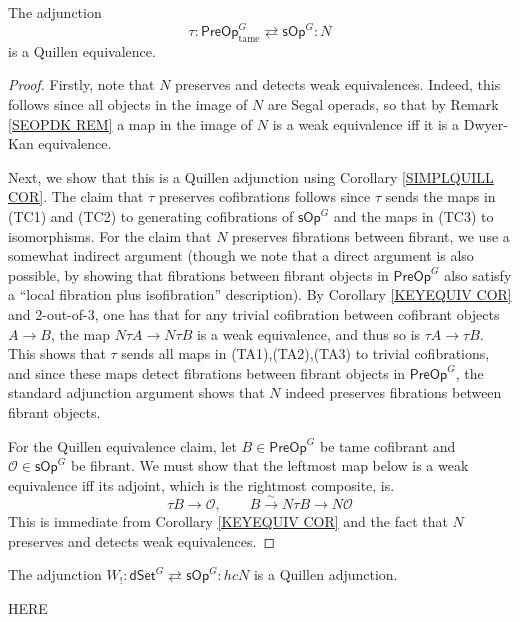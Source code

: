 \documentclass[a4paper,10pt
,draft
]{article}%
\renewcommand{\1}{\ensuremath{\mathbb{id}}}
\begin{document}
\begin{proposition}
The adjunction
\[
	\tau \colon \mathsf{PreOp}^G_{\text{tame}}
		\rightleftarrows 
	\mathsf{sOp}^G \colon N
\]
is a Quillen equivalence.
\end{proposition}


\begin{proof}
Firstly, note that $N$ preserves and detects weak equivalences.
Indeed, this follows since all objects in the image of $N$ are Segal operads, so that by Remark \ref{SEOPDK REM} a map in the image of $N$ is a weak equivalence iff it is a Dwyer-Kan equivalence.

Next, we show that this is a Quillen adjunction using Corollary \ref{SIMPLQUILL COR}.
The claim that $\tau$ preserves cofibrations follows since
$\tau$ sends the maps in (TC1) and (TC2) to generating cofibrations of $\mathsf{sOp}^G$ and the maps in (TC3) to isomorphisms.
For the claim that $N$ preserves fibrations between fibrant,
we use a somewhat indirect argument
(though we note that a direct argument is also possible,
by showing that fibrations between fibrant objects in $\mathsf{PreOp}^G$
also satisfy a ``local fibration plus isofibration'' description).
By Corollary \ref{KEYEQUIV COR} and 2-out-of-3, 
one has that for any trivial cofibration between cofibrant objects
$A \to B$, the map $N \tau A \to N \tau B$ is a weak equivalence, and thus so is $\tau A \to \tau B$.
This shows that $\tau$ sends all maps in (TA1),(TA2),(TA3)
to trivial cofibrations, and since these maps detect fibrations between fibrant objects in $\mathsf{PreOp}^G$, 
the standard adjunction argument shows that 
$N$ indeed preserves fibrations between fibrant objects.

For the Quillen equivalence claim, 
let $B \in \mathsf{PreOp}^G$ be tame cofibrant and
$\mathcal{O} \in \mathsf{sOp}^G$ be fibrant.
We must show that the leftmost map below is a weak equivalence iff its adjoint, which is the rightmost composite, is.
\[
	\tau B \to \mathcal{O},
\qquad
	B \xrightarrow{\sim} N \tau B \to N \mathcal{O}
\]
This is immediate from Corollary \ref{KEYEQUIV COR}
and the fact that $N$ preserves and detects weak equivalences.
\end{proof}


\begin{proposition}
	The adjunction 
$W_! \colon \mathsf{dSet}^G 
	\rightleftarrows 
\mathsf{sOp}^G \colon hcN$
	is a Quillen adjunction.
\end{proposition}

{\color{red} HERE}
\end{document}
